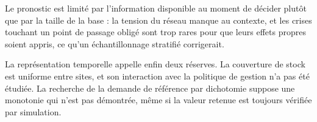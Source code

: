 Le pronostic est limité par l'information disponible au moment de décider plutôt que par la taille de la base : la tension du réseau manque au contexte, et les crises touchant un point de passage obligé sont trop rares pour que leurs effets propres soient appris, ce qu'un échantillonnage stratifié corrigerait.

La représentation temporelle appelle enfin deux réserves. La couverture de stock est uniforme entre sites, et son interaction avec la politique de gestion n'a pas été étudiée. La recherche de la demande de référence par dichotomie suppose une monotonie qui n'est pas démontrée, même si la valeur retenue est toujours vérifiée par simulation.